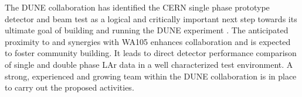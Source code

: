 The DUNE collaboration has identified the CERN single phase prototype detector and beam test as a logical and critically important next
step towards its ultimate goal of building and running the DUNE experiment \cite{dunecdr}. The anticipated proximity to and synergies with WA105 enhances collaboration and is expected to foster community building. It leads to direct detector performance comparison of single and double phase LAr data in a well characterized test environment. 
%
A strong, experienced and growing team within the DUNE collaboration is in place to carry out the proposed activities.











